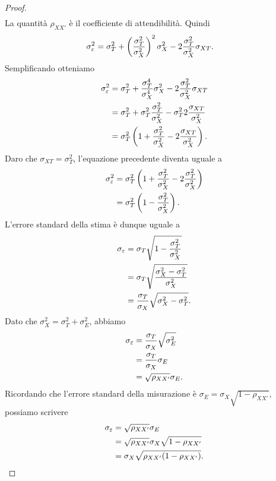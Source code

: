 \begin{proof}
\begin{align}
\end{align}
La quantità $\rho_{XX'}$ è il coefficiente di attendibilità.  Quindi
\begin{align}
\sigma^2_{\varepsilon} &= \sigma^2_T + \left(\frac{\sigma_T^2}{\sigma_X^2}\right)^2 \sigma^2_X - 2  \frac{\sigma_T^2}{\sigma_X^2} \sigma_{XT}.\notag
\end{align}
Semplificando otteniamo
\begin{align}
\sigma^2_{\varepsilon} &= \sigma^2_T + \frac{\sigma_T^4}{\sigma_X^4}
\sigma^2_X - 2  \frac{\sigma_T^2}{\sigma_X^2} \sigma_{XT}\notag\\ 
&= \sigma^2_T + \sigma^2_T\frac{\sigma_T^2}{\sigma_X^2} -  \sigma_T^2 2
\frac{\sigma_{XT}}{\sigma_X^2} \notag\\ 
&= \sigma^2_T \left(1 + \frac{\sigma_T^2}{\sigma_X^2} - 2
  \frac{\sigma_{XT}}{\sigma_X^2}\right).\notag 
\end{align}
Daro che $\sigma_{XT}=\sigma^2_T$, l'equazione precedente diventa uguale a
\begin{align}
\sigma^2_{\varepsilon} &= \sigma^2_T \left(1
  +\frac{\sigma_T^2}{\sigma_X^2} - 2
  \frac{\sigma_{T}^2}{\sigma_X^2}\right)\notag\\
&= \sigma^2_T \left(1 - 
  \frac{\sigma_{T}^2}{\sigma_X^2}\right).\notag
\end{align}
L'errore standard della stima è dunque uguale a 
\begin{align}
\sigma_{\varepsilon} 
&=\sigma_T \sqrt{1-\frac{\sigma^2_T}{\sigma^2_X}}\notag\\
&=\sigma_T \sqrt{\frac{\sigma^2_X - \sigma^2_T}{\sigma^2_X}}\notag\\
&=\frac{\sigma_T}{\sigma_X} \sqrt{\sigma^2_X - \sigma^2_T}.\notag
\end{align}
Dato che $\sigma^2_X=\sigma^2_T+\sigma^2_E$, abbiamo 
\begin{align}
\sigma_{\varepsilon} 
 &= \frac{\sigma_T}{\sigma_X} \sqrt{\sigma^2_E }\notag\\
&=  \frac{\sigma_T}{\sigma_X} \sigma_E \notag\\
&= \sqrt{\rho_{XX'}} \sigma_E. \notag
\end{align}
Ricordando che l'errore standard della misurazione è
  $\sigma_E = \sigma_X \sqrt{1 - \rho_{XX'}}$, 
  possiamo scrivere
\begin{align}
\sigma_{\varepsilon}  &= \sqrt{\rho_{XX'}} \sigma_E \notag\\
&= \sqrt{\rho_{XX'}} \sigma_X
\sqrt{1-\rho_{XX'}} \notag\\
&= \sigma_X \sqrt{\rho_{XX'} (1 - \rho_{XX'})}.\notag
\end{align}
\end{proof}

